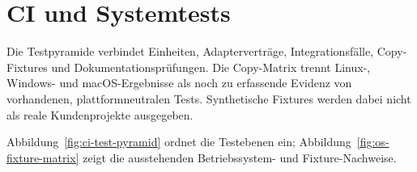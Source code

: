 \section{CI und Systemtests}
\label{chap:ci-system-testing}

Die Testpyramide verbindet Einheiten, Adapterverträge, Integrationsfälle, Copy-Fixtures
und Dokumentationsprüfungen. Die Copy-Matrix trennt Linux-, Windows- und macOS-Ergebnisse
als noch zu erfassende \Measured{} Evidenz von vorhandenen, plattformneutralen Tests.
Synthetische Fixtures werden dabei nicht als reale Kundenprojekte ausgegeben.

Abbildung~\ref{fig:ci-test-pyramid} ordnet die Testebenen ein; Abbildung~\ref{fig:os-fixture-matrix}
zeigt die ausstehenden Betriebssystem- und Fixture-Nachweise.

